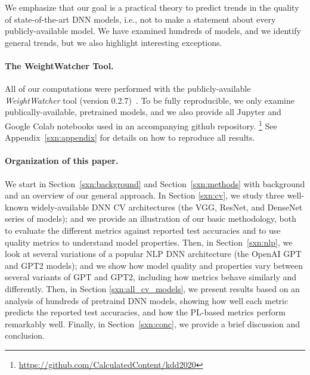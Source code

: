 \noindent
We emphasize that our goal is a practical theory to predict trends in the quality of state-of-the-art DNN models, i.e., not to make a statement about every publicly-available model.
We have examined hundreds of models, and we identify general trends, but we also highlight interesting exceptions.

\paragraph{The WeightWatcher Tool.}

All of our computations were performed with the publicly-available \emph{WeightWatcher} tool (version 0.2.7)~\cite{weightwatcher_package}.
To be fully reproducible, we only examine publically-available, pretrained models, and we also provide all Jupyter and Google Colab notebooks used in an accompanying github repository.%
\footnote{\url{https://github.com/CalculatedContent/kdd2020} }
See Appendix~\ref{sxn:appendix} for details on how to reproduce all results.


\paragraph{Organization of this paper.}

We start in Section~\ref{sxn:background} and Section~\ref{sxn:methods} with background and an overview of our general approach.
In Section \ref{sxn:cv}, we study three well-known widely-available DNN CV architectures (the VGG, ResNet, and DenseNet series of models); and we provide an illustration of our basic methodology, both to evaluate the different metrics against reported test accuracies and to use quality metrics to understand model properties.
Then, in Section~\ref{sxn:nlp}, we look at several variations of a popular NLP DNN architecture (the OpenAI GPT and GPT2 models); and we show how model quality and properties vary between several variants of GPT and GPT2, including how metrics behave similarly and differently.
Then, in Section \ref{sxn:all_cv_models}, we present results based on an analysis of hundreds of pretraind DNN models, showing how well each metric predicts the reported test accuracies, and how the PL-based metrics perform remarkably well.
Finally, in Section~\ref{sxn:conc}, we provide a brief discussion and conclusion.



